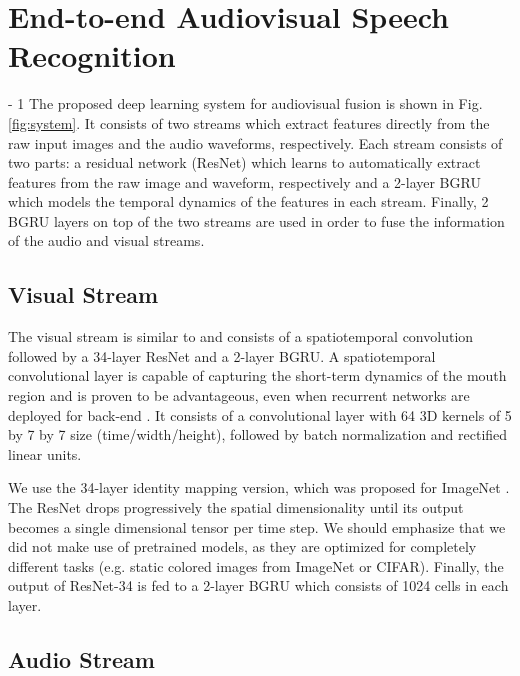 \documentclass{article}
\begin{document}
\section{End-to-end Audiovisual Speech Recognition}
\looseness - 1
The proposed deep learning system for audiovisual fusion is shown  in Fig. \ref{fig:system}. It consists of two streams which extract features directly from the raw input images and the audio waveforms, respectively. Each stream consists of two parts: a residual network (ResNet) \cite{he2016deep} which learns to automatically extract features from the raw image and waveform, respectively and a 2-layer BGRU which models the temporal dynamics of the features in each stream. Finally, 2 BGRU layers on top of the two streams are used in order to fuse the information of the audio and visual streams.  


\subsection{Visual Stream}
The visual stream is similar to \cite{stafylakis2017combining} and consists of a spatiotemporal convolution 
followed by a 34-layer ResNet and a 2-layer BGRU. A spatiotemporal convolutional layer
is capable of capturing the short-term dynamics of the
mouth region and is proven to be advantageous, even when
recurrent networks are deployed for back-end \cite{assael2016lipnet}. It consists
of a convolutional layer with 64 3D kernels
of 5 by 7 by 7 size (time/width/height), followed by batch normalization and rectified linear units. 

 We use the 34-layer identity mapping
version, which was proposed for ImageNet \cite{he2016identity}. The ResNet drops progressively the
spatial dimensionality until its output
becomes a single dimensional tensor per time step. We should
emphasize that we did not make use of pretrained models, as
they are optimized for completely different tasks (e.g. static
colored images from ImageNet or CIFAR). Finally, the output of ResNet-34 is fed to a 2-layer BGRU which consists of 1024 cells in each layer. 



\subsection{Audio Stream}
\end{document}
